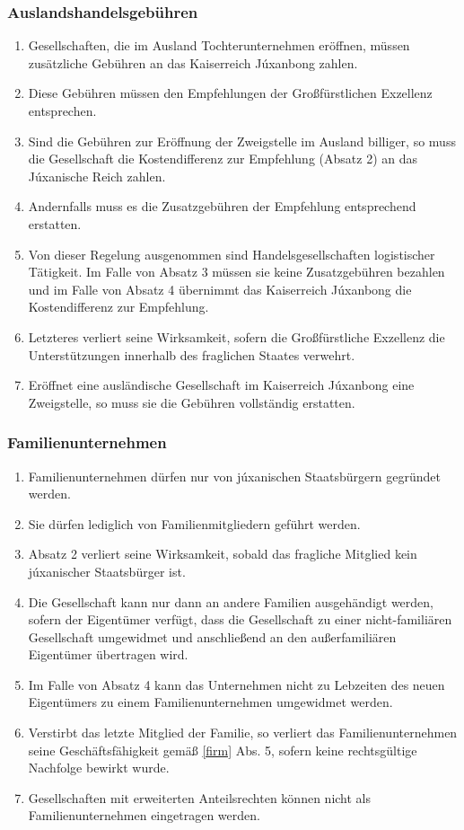 \documentclass{article}
\begin{document}
\subsubsection{Auslandshandelsgebühren}
\begin{enumerate}[(1)]
    \item Gesellschaften, die im Ausland Tochterunternehmen eröffnen, müssen zusätzliche Gebühren an das Kaiserreich Júxanbong zahlen.
    \item Diese Gebühren müssen den Empfehlungen der Großfürstlichen Exzellenz entsprechen. 
    \item Sind die Gebühren zur Eröffnung der Zweigstelle im Ausland billiger, so muss die Gesellschaft die Kostendifferenz zur Empfehlung (Absatz 2) an das Júxanische Reich zahlen.
    \item Andernfalls muss es die Zusatzgebühren der Empfehlung entsprechend erstatten.
    \item Von dieser Regelung ausgenommen sind Handelsgesellschaften logistischer Tätigkeit. Im Falle von Absatz 3 müssen sie keine Zusatzgebühren bezahlen und im Falle von Absatz 4 übernimmt das Kaiserreich Júxanbong die Kostendifferenz zur Empfehlung.
    \item Letzteres verliert seine Wirksamkeit, sofern die Großfürstliche Exzellenz die Unterstützungen innerhalb des fraglichen Staates verwehrt.
    \item Eröffnet eine ausländische Gesellschaft im Kaiserreich Júxanbong eine Zweigstelle, so muss sie die Gebühren vollständig erstatten.
\end{enumerate}


\subsubsection{Familienunternehmen} \label{familien}
\begin{enumerate}[(1)]
    \item Familienunternehmen dürfen nur von júxanischen Staatsbürgern gegründet werden.
    \item Sie dürfen lediglich von Familienmitgliedern geführt werden.
    \item Absatz 2 verliert seine Wirksamkeit, sobald das fragliche Mitglied kein júxanischer Staatsbürger ist.
    \item Die Gesellschaft kann nur dann an andere Familien ausgehändigt werden, sofern der Eigentümer verfügt, dass die Gesellschaft zu einer nicht-familiären Gesellschaft umgewidmet und anschließend an den außerfamiliären Eigentümer übertragen wird.
    \item Im Falle von Absatz 4 kann das Unternehmen nicht zu Lebzeiten des neuen Eigentümers zu einem Familienunternehmen umgewidmet werden.
    \item Verstirbt das letzte Mitglied der Familie, so verliert das Familienunternehmen seine Geschäftsfähigkeit gemäß \ref{firm} Abs. 5, sofern keine rechtsgültige Nachfolge bewirkt wurde.
    \item Gesellschaften mit erweiterten Anteilsrechten können nicht als Familienunternehmen eingetragen werden.
\end{enumerate}
\end{document}
